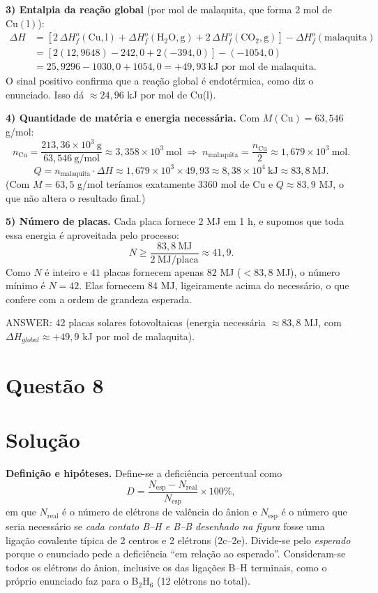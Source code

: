 \documentclass{article}%
\begin{document}
\textbf{3) Entalpia da reação global} (por mol de malaquita, que forma 2 mol de $\mathrm{Cu(l)}$):
\[
\begin{aligned}
\Delta H &= \left[2\,\Delta H_f^o(\mathrm{Cu,l})+\Delta H_f^o(\mathrm{H_2O,g})+2\,\Delta H_f^o(\mathrm{CO_2,g})\right]-\Delta H_f^o(\mathrm{malaquita})\\
&= \left[2(12{,}9648)-242{,}0+2(-394{,}0)\right]-(-1054{,}0)\\
&= 25{,}9296-1030{,}0+1054{,}0 = +49{,}93\ \text{kJ por mol de malaquita}.
\end{aligned}
\]
O sinal positivo confirma que a reação global é endotérmica, como diz o enunciado. Isso dá $\approx 24{,}96$ kJ por mol de Cu(l).

\textbf{4) Quantidade de matéria e energia necessária.} Com $M(\mathrm{Cu})=63{,}546$ g/mol:
\[
n_{\mathrm{Cu}}=\frac{213{,}36\times10^{3}\ \text{g}}{63{,}546\ \text{g/mol}}\approx 3{,}358\times10^{3}\ \text{mol}
\;\Rightarrow\; n_{\mathrm{malaquita}}=\frac{n_{\mathrm{Cu}}}{2}\approx 1{,}679\times10^{3}\ \text{mol}.
\]
\[
Q=n_{\mathrm{malaquita}}\cdot\Delta H\approx 1{,}679\times10^{3}\times 49{,}93\approx 8{,}38\times10^{4}\ \text{kJ}\approx 83{,}8\ \text{MJ}.
\]
(Com $M=63{,}5$ g/mol teríamos exatamente 3360 mol de Cu e $Q\approx 83{,}9$ MJ, o que não altera o resultado final.)

\textbf{5) Número de placas.} Cada placa fornece 2 MJ em 1 h, e supomos que toda essa energia é aproveitada pelo processo:
\[
N\ge\frac{83{,}8\ \text{MJ}}{2\ \text{MJ/placa}}\approx 41{,}9 .
\]
Como $N$ é inteiro e $41$ placas fornecem apenas $82$ MJ ($<83{,}8$ MJ), o número mínimo é $N=42$. Elas fornecem 84 MJ, ligeiramente acima do necessário, o que confere com a ordem de grandeza esperada.

ANSWER: 42 placas solares fotovoltaicas (energia necessária $\approx 83{,}8$ MJ, com $\Delta H_{global}\approx +49{,}9$ kJ por mol de malaquita).%
\newpage%
\section*{Questão 8}

\section*{Solução}

\textbf{Definição e hipóteses.} Define-se a deficiência percentual como
\[
D=\frac{N_{\text{esp}}-N_{\text{real}}}{N_{\text{esp}}}\times 100\%,
\]
em que $N_{\text{real}}$ é o número de elétrons de valência do ânion e $N_{\text{esp}}$ é o número que seria necessário se \emph{cada contato B--H e B--B desenhado na figura} fosse uma ligação covalente típica de 2 centros e 2 elétrons (2c--2e). Divide-se pelo \emph{esperado} porque o enunciado pede a deficiência ``em relação ao esperado''. Consideram-se todos os elétrons do ânion, inclusive os das ligações B--H terminais, como o próprio enunciado faz para o B$_2$H$_6$ (12 elétrons no total).
\end{document}
